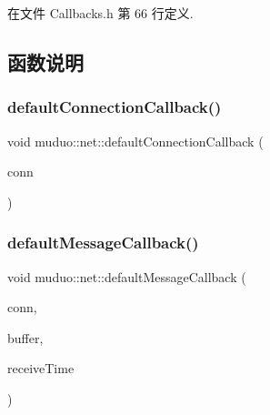 在文件 Callbacks.\+h 第 66 行定义.



\subsection{函数说明}
\mbox{\label{namespacemuduo_1_1net_a74d4cd57249902f889bfecb4bad7847d}} 
\subsubsection{\texorpdfstring{default\+Connection\+Callback()}{defaultConnectionCallback()}}
{\footnotesize\ttfamily void muduo\+::net\+::default\+Connection\+Callback (\begin{DoxyParamCaption}\item[{const \hyperlink{namespacemuduo_1_1net_ab91a46e9290926aa692450e46cfc9039}{Tcp\+Connection\+Ptr} \&}]{conn }\end{DoxyParamCaption})}

\mbox{\label{namespacemuduo_1_1net_abea01f500af8f956edd6649639937508}} 
\subsubsection{\texorpdfstring{default\+Message\+Callback()}{defaultMessageCallback()}}
{\footnotesize\ttfamily void muduo\+::net\+::default\+Message\+Callback (\begin{DoxyParamCaption}\item[{const \hyperlink{namespacemuduo_1_1net_ab91a46e9290926aa692450e46cfc9039}{Tcp\+Connection\+Ptr} \&}]{conn,  }\item[{\hyperlink{classmuduo_1_1net_1_1Buffer}{Buffer} $\ast$}]{buffer,  }\item[{\hyperlink{classmuduo_1_1Timestamp}{Timestamp}}]{receive\+Time }\end{DoxyParamCaption})}

